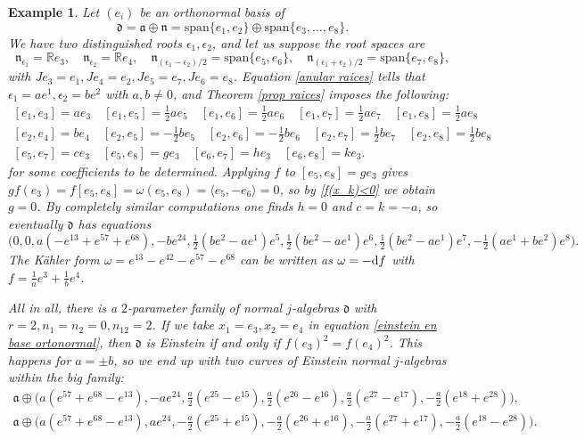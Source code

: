 \documentclass[12pt, twoside]{amsart}
\def\D{\textup{d}}
\def\d{\mathfrak{d}}
\def\n{\mathfrak{n}}
\def\a{\mathfrak{a}}
\def\R{\mathbb{R}}
\newtheorem{example}[definition]{\bf Example}
\theoremstyle{definition}
\begin{document}
\begin{example} 
{\rm    Let $(e_i)$ be an orthonormal basis of 
    $$\d=\a \oplus \n = \text{span}\{e_1,e_2\} \oplus \text{span}\{e_3, \ldots,  e_8\}.$$ 
We have two distinguished roots $\epsilon_1, \epsilon_2$, and let us suppose  the root spaces are 
$$\n_{\epsilon_1}=\R e_3,\quad \n_{\epsilon_2}=\R e_4,\quad 
\n_{(\epsilon_{1}-\epsilon_{2})/2}=\text{span}\{e_5,e_6\}, \quad
\n_{(\epsilon_{1}+\epsilon_{2})/2}=\text{span}\{e_7,e_8\},$$ 
with $Je_3=e_{1}, Je_{4}=e_2, Je_5=e_7, Je_6=e_8$. 
Equation \eqref{anular raices} tells that $\epsilon_{1}=a e^{1}, \epsilon_{2}=be^{2}$ with $a,b \neq 0$, and Theorem \ref{prop raices} imposes the following: 
$$\begin{array}{c}
[e_1,e_3]=ae_3 \quad
[e_1,e_5]=\tfrac{1}{2}ae_5 \quad
 [e_1,e_6]=\tfrac{1}{2}ae_6 \quad
 [e_1,e_7]=\tfrac{1}{2}ae_7 \quad
 [e_1,e_8]=\tfrac{1}{2}ae_8\\[2mm]
 {}[e_2,e_4]=be_4 \quad 
 [e_2,e_5]=-\tfrac{1}{2}be_5 \quad
 [e_2,e_6]=-\tfrac{1}{2}be_6 \quad
 [e_2,e_7]=\tfrac{1}{2}be_7 \quad
 [e_2,e_8]=\tfrac{1}{2}be_8 \\[2mm]
{}[e_5,e_7]=ce_3 \quad 
 [e_5,e_8]=ge_3 \quad
 [e_6,e_7]=he_3 \quad
 [e_6,e_8]=ke_3.
\end{array}$$
for some coefficients to be determined. Applying $f$ to $[e_5,e_8]=ge_3$ gives $g f(e_3)= f[e_5,e_8]= \omega(e_5,e_8)=\langle e_5, -e_6 \rangle=0$, so by \eqref{f(x_k)<0} we obtain $g=0$. 
By completely similar computations one finds $h=0$ and $c=k=-a$, so eventually $\d$ has equations
\begin{equation*}
\big(0, 0, a(-e^{13}+e^{57}+e^{68}), -be^{24}, 
\tfrac{1}{2}(be^{2}-ae^{1})e^5, 
\tfrac{1}{2}(be^{2}-ae^{1})e^6, 
\tfrac{1}{2}(be^{2}-ae^{1})e^7, 
-\tfrac{1}{2}(ae^{1}+be^{2})e^8\big).
\end{equation*}
The K{\"a}hler form $\omega=e^{13}-e^{42}-e^{57}-e^{68}$ 
can be written as $\omega=-\D f$ with
$f=\frac{1}{a}e^{3}+\frac{1}{b}e^{4}$. \par
\quad All in all, there is a $2$-parameter family of normal $j$-algebras $\d$ 
with $r=2, n_{1}=n_{2}=0,  n_{12}=2 $.
If we take $x_1=e_3, x_2=e_4$ in equation \eqref{einstein en base ortonormal}, then $\d$ is Einstein if and only if  $f(e_3)^2=f(e_4)^2$. This happens for  $a=\pm b$, so we end up with two curves of Einstein normal $j$-algebras within the big family:
\begin{equation*}\begin{array}{c}
\a\oplus \big(a(e^{57}+e^{68}-e^{13}), -ae^{24}, 
\tfrac{a}{2}(e^{25}-e^{15}), 
\tfrac{a}{2}(e^{26}-e^{16}), 
\tfrac{a}{2}(e^{27}-e^{17}), 
-\tfrac{a}{2}(e^{18}+e^{28})\big), \\[1mm]
\a\oplus \big(a(e^{57}+e^{68}-e^{13}), ae^{24}, 
-\tfrac{a}{2}(e^{25}+e^{15}), 
-\tfrac{a}{2}(e^{26}+e^{16}), 
-\tfrac{a}{2}(e^{27}+e^{17}), 
-\tfrac{a}{2}(e^{18}-e^{28})\big).
\end{array}\end{equation*}}
\end{example}
\end{document}
